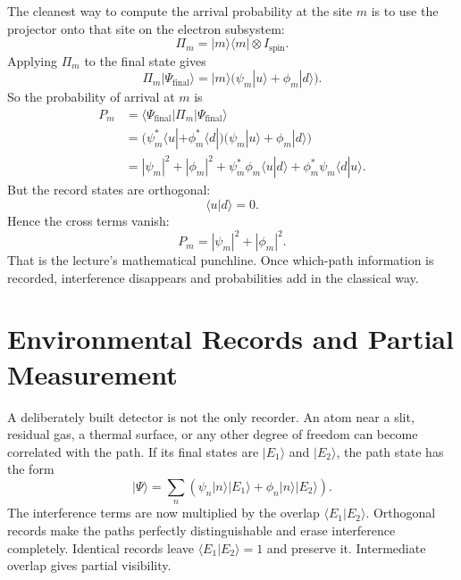 The cleanest way to compute the arrival probability at the site \(m\) is to use the projector onto that site on the electron subsystem:
\begin{equation}
\Pi_m = |m\rangle\langle m|\otimes I_{\mathrm{spin}}.
\end{equation}
Applying \(\Pi_m\) to the final state gives
\begin{equation}
\Pi_m |\Psi_{\mathrm{final}}\rangle
= |m\rangle\bigl(\psi_m|u\rangle+\phi_m|d\rangle\bigr).
\end{equation}
So the probability of arrival at \(m\) is
\begin{align}
P_m
  &= \langle \Psi_{\mathrm{final}}|\Pi_m|\Psi_{\mathrm{final}}\rangle \\
  &= \bigl(\psi_m^*\langle u|+\phi_m^*\langle d|\bigr)
     \bigl(\psi_m|u\rangle+\phi_m|d\rangle\bigr) \\
  &= |\psi_m|^2 + |\phi_m|^2
     + \psi_m^*\phi_m\langle u|d\rangle
     + \phi_m^*\psi_m\langle d|u\rangle.
\end{align}
But the record states are orthogonal:
\begin{equation}
\langle u|d\rangle=0.
\end{equation}
Hence the cross terms vanish:
\begin{equation}
P_m = |\psi_m|^2 + |\phi_m|^2.
\end{equation}
That is the lecture's mathematical punchline. Once which-path information is recorded, interference disappears and probabilities add in the classical way.

\begin{classroomqa}
\end{classroomqa}

\section{Environmental Records and Partial Measurement}

A deliberately built detector is not the only recorder. An atom near a slit, residual gas, a thermal surface, or any other degree of freedom can become correlated with the path. If its final states are \(|E_1\rangle\) and \(|E_2\rangle\), the path state has the form
\begin{equation}
|\Psi\rangle
=\sum_n\left(\psi_n|n\rangle|E_1\rangle
+\phi_n|n\rangle|E_2\rangle\right).
\end{equation}
The interference terms are now multiplied by the overlap \(\langle E_1|E_2\rangle\). Orthogonal records make the paths perfectly distinguishable and erase interference completely. Identical records leave \(\langle E_1|E_2\rangle=1\) and preserve it. Intermediate overlap gives partial visibility.

